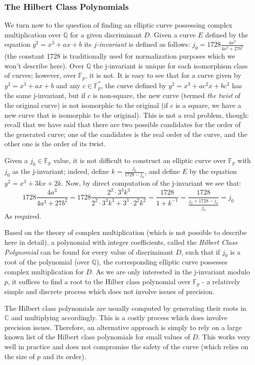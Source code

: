 \documentclass[11pt,english]{article}
\begin{document}
\subsubsection{The Hilbert Class Polynomials}
We turn now to the question of finding an elliptic curve possessing complex multiplication over $\mathbb{Q}$ for a given discriminant $D$. Given a
curve $E$ defined by the equation $y^2=x^3+ax+b$ its \emph{$j$-invariant} is defined as follows: $j_0=1728\frac{4a^3}{4a^3+27b^2}$ (the
constant 1728 is traditionally used for normalization purposes which we won't describe here). Over $\mathbb{Q}$ the j-invariant is unique for each
isomorphism class of curves; however, over $\mathbb{F}_p$, it is not. It is easy to see that for a curve given by $y^2=x^3+ax+b$ and any $c\in\mathbb{F}^*_p$,
the curve defined by $y^2=x^3+ac^2x+bc^3$ has the same j-invariant, but if $c$ is non-square, the new curve (termed \emph{the twist} of the original curve)
is not isomorphic to the original (if $c$ is a square, we have a new curve that is isomorphic to the original). This is not a real problem, though: recall that we have said that there are two possible candidates for the order of
the generated curve; one of the candidates is the real order of the curve, and the other one is the order of its twist.

Given a $j_0\in\mathbb{F}_p$ value, it is not difficult to construct an elliptic curve over $\mathbb{F}_p$ with $j_0$ as the j-invariant;
indeed, define $k=\frac{j_0}{1728-j_0}$, and define $E$ by the equation $y^2=x^3+3kx+2k$. Now, by direct computation of the j-invariant we see that:
$$1728\frac{4a^3}{4a^3+27b^2}=1728\frac{2^2\cdot 3^3k^3}{2^2\cdot 3^3k^3+3^3\cdot 2^2k^2}=\frac{1728}{1+k^{-1}}=
\frac{1728}{\frac{j_0+1728-j_0}{j_0}}=j_0$$
As required.

Based on the theory of complex multiplication (which is not possible to describe here in detail), a polynomial with integer coefficients, called the \emph{Hilbert Class Polynomial}
can be found for every value of discriminant $D$, such that if $j_0$ is a root of the polynomial (over $\mathbb{Q}$), the corresponding elliptic curve
possesses complex multiplication for $D$. As we are only interested in the j-invariant modulo $p$, it suffices to find a root to the Hilber class polynomial
over $\mathbb{F}_p$ - a relatively simple and discrete process which does not involve issues of precision.

The Hilbert class polynomials are usually computed by generating their roots in $\mathbb{C}$ and multiplying accordingly. This is a costly process which
does involve precision issues. Therefore, an alternative approach is simply to rely on a large known list of the Hilbert class polynomials for small values of $D$. This
works very well in practice and does not compromise the safety of the curve (which relies on the size of $p$ and its order).
\end{document}
